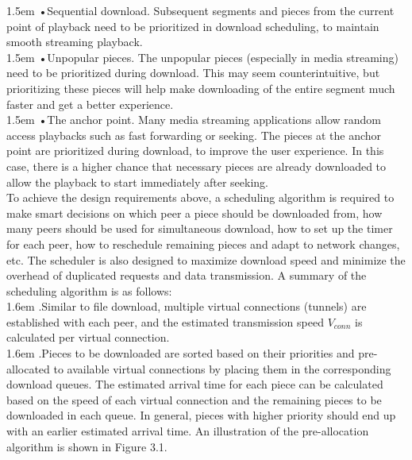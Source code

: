 \documentclass[10pt,a4paper]{article}
\begin{document}
\hangindent 1.5em
\noindent   
•\quad Sequential download. Subsequent segments and pieces from the current point of playback need to be prioritized in download scheduling, to maintain smooth streaming playback.
\vspace{-0.8em}
\\

\hangindent 1.5em
\noindent   
•\quad Unpopular pieces. The unpopular pieces (especially in media streaming) need to be prioritized during download. This may seem counterintuitive, but prioritizing these pieces will help make downloading of the entire segment much faster and get a better experience.
\vspace{-0.8em}
\\ 

\hangindent 1.5em
\noindent   
•\quad The anchor point. Many media streaming applications allow random access playbacks such as fast forwarding or seeking. The pieces at the anchor point are prioritized during download, to improve the user experience. In this case, there is a higher chance that necessary pieces are already downloaded to allow the playback to start immediately after seeking.
\vspace{-0.6em}
\\ 

\noindent   
To achieve the design requirements above, a scheduling algorithm is required to make smart decisions on which peer a piece should be downloaded from, how many peers should be used for simultaneous download, how to set up the timer for each peer, how to reschedule remaining pieces and adapt to network changes, etc. The scheduler is also designed to maximize download speed and minimize the overhead of duplicated requests and data transmission. A summary of the scheduling algorithm is as follows:
\vspace{-0.8em}
\\ 

\hangindent 1.6em
.\quad  Similar to file download, multiple virtual connections (tunnels) are established with each peer, and the estimated transmission speed $V_{conn}$ is calculated per virtual connection.
\vspace{-0.8em}
\\ 

\hangindent 1.6em
.\quad Pieces to be downloaded are sorted based on their priorities and pre-allocated to available virtual connections by placing them in the corresponding download queues. The estimated arrival time for each piece can be calculated based on the speed of each virtual connection and the remaining pieces to be downloaded in each queue. In general, pieces with higher priority should end up with an earlier estimated arrival time. An illustration of the pre-allocation algorithm is shown in Figure 3.1.
\vspace{-0.8em}
\\ 
\end{document}
